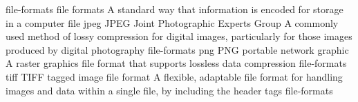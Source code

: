 \newglsXterm%
{file-formats}%
{file formats}%
{A standard way that information is encoded for storage in a computer file}%
\newglsXacronym%
{jpeg}%
{JPEG}%
{Joint Photographic Experts Group}%
{A commonly used method of lossy compression for digital images, particularly for those images produced by digital photography}%
{file-formats}%
\newglsXacronym%
{png}%
{PNG}%
{portable network graphic}%
{A raster graphics file format that supports lossless data compression}%
{file-formats}%
\newglsXacronym%
{tiff}%
{TIFF}%
{tagged image file format}%
{A flexible, adaptable file format for handling images and data within a single file, by including the header tags}%
{file-formats}%
